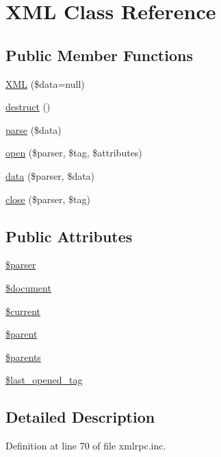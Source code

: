 \hypertarget{classXML}{
\section{XML Class Reference}
\label{classXML}
}
\subsection*{Public Member Functions}
\begin{CompactItemize}
\item 
\hyperlink{classXML_1475a1374023931e2227277f4047c9aa}{XML} (\$data=null)
\item 
\hyperlink{classXML_d1524d80c783b2cd22966462411b9b7d}{destruct} ()
\item 
\hyperlink{classXML_61e6258dc3d5750100e1f0dd08d6334a}{parse} (\$data)
\item 
\hyperlink{classXML_eac7eae74d866d4f5a0cdb9be27ff279}{open} (\$parser, \$tag, \$attributes)
\item 
\hyperlink{classXML_ca70dfbd3e8ce956075181701b09b033}{data} (\$parser, \$data)
\item 
\hyperlink{classXML_60144a2134fc1b7f5b4b1b6a7c56bf04}{close} (\$parser, \$tag)
\end{CompactItemize}
\subsection*{Public Attributes}
\begin{CompactItemize}
\item 
\hyperlink{classXML_fa14fbca44236b30ab5f3dcfc4b02890}{\$parser}
\item 
\hyperlink{classXML_01d565098eeda8bf09e4242a2748d570}{\$document}
\item 
\hyperlink{classXML_7c20d75c1719294f3320a537a32753ca}{\$current}
\item 
\hyperlink{classXML_fa51193c2f0b317f817fa3efa8722227}{\$parent}
\item 
\hyperlink{classXML_c10be009a77c59e80ce5562d4dd35532}{\$parents}
\item 
\hyperlink{classXML_60e7e74df6643f50e0c6ea8252554b3d}{\$last\_\-opened\_\-tag}
\end{CompactItemize}


\subsection{Detailed Description}


Definition at line 70 of file xmlrpc.inc.

